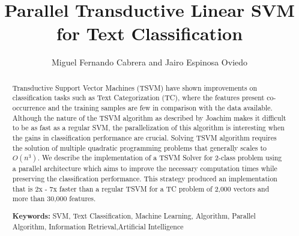 




%


\title{Parallel Transductive Linear SVM for Text Classification}

\author{Miguel Fernando Cabrera and Jairo Espinosa Oviedo}



\maketitle

\begin{abstract}
Transductive Support Vector Machines (TSVM) have shown improvements
on classification tasks such as Text Categorization (TC), where the
features present co-occurrence and the training samples are few in
comparison with the data available. Although the nature of the TSVM
algorithm as described by Joachim makes it difficult to be as fast
as a regular SVM, the parallelization of this algorithm is interesting
when the gains in classification performance are crucial. Solving
TSVM algorithm requires the solution of multiple quadratic programming
problems that generally scales to $O(n^{3})$. We describe the implementation
of a TSVM Solver for 2-class problem using a parallel architecture
which aims to improve the necessary computation times while preserving
the classification performance. This strategy produced an implementation 
that is 2x - 7x faster than a regular TSVM for a TC problem of 2,000 vectors 
and more than 30,000 features.

{\bf Keywords:} SVM, Text Classification, Machine Learning, Algorithm,
Parallel Algorithm, Information Retrieval,Artificial Intelligence

\end{abstract}

